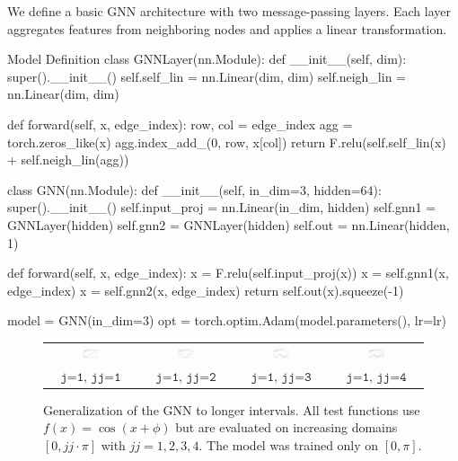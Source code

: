 We define a basic GNN architecture with two message-passing layers. Each layer aggregates features from neighboring nodes and applies a linear transformation.

\begin{codeonly}{Model Definition}
class GNNLayer(nn.Module):
    def __init__(self, dim):
        super().__init__()
        self.self_lin = nn.Linear(dim, dim)
        self.neigh_lin = nn.Linear(dim, dim)

    def forward(self, x, edge_index):
        row, col = edge_index
        agg = torch.zeros_like(x)
        agg.index_add_(0, row, x[col])
        return F.relu(self.self_lin(x) + self.neigh_lin(agg))

class GNN(nn.Module):
    def __init__(self, in_dim=3, hidden=64):
        super().__init__()
        self.input_proj = nn.Linear(in_dim, hidden)
        self.gnn1 = GNNLayer(hidden)
        self.gnn2 = GNNLayer(hidden)
        self.out = nn.Linear(hidden, 1)

    def forward(self, x, edge_index):
        x = F.relu(self.input_proj(x))
        x = self.gnn1(x, edge_index)
        x = self.gnn2(x, edge_index)
        return self.out(x).squeeze(-1)

model = GNN(in_dim=3)
opt = torch.optim.Adam(model.parameters(), lr=lr)
\end{codeonly}

\begin{figure}[ht]
  \centering
  \begin{tabular}{cccc}
    \includegraphics[width=0.23\textwidth]{images/gnn_obs_naive_j1_jj1_0.png} &
    \includegraphics[width=0.23\textwidth]{images/gnn_obs_naive_j1_jj2_0.png} &
    \includegraphics[width=0.23\textwidth]{images/gnn_obs_naive_j1_jj3_0.png} &
    \includegraphics[width=0.23\textwidth]{images/gnn_obs_naive_j1_jj4_0.png} \\
    $\texttt{j=1, jj=1}$ & $\texttt{j=1, jj=2}$ & $\texttt{j=1, jj=3}$ & $\texttt{j=1, jj=4}$ \\
  \end{tabular}
  \caption{Generalization of the GNN to longer intervals. All test functions use $f(x) = \cos(x + \phi)$ but are evaluated on increasing domains $[0, jj \cdot \pi]$ with $jj = 1, 2, 3, 4$. The model was trained only on $[0, \pi]$.}
  \label{fig:gnn_generalization_jj}
\end{figure}


